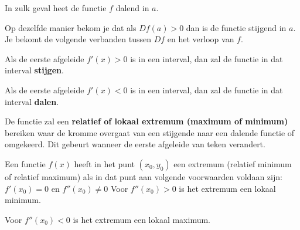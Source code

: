 \begin{center}
	
\end{center}



In zulk geval heet de functie $f$ dalend in $a$.\vspace{5mm}

Op dezelfde manier bekom je dat als $Df(a)>0$ dan is de functie stijgend in $a$.
Je bekomt de volgende verbanden tussen $Df$ en het verloop van $f$.

\begin{eigenschap}
Als de eerste afgeleide $f'(x)>0$  is in een interval, dan zal de functie in dat interval \textbf{stijgen}.

Als de eerste afgeleide $f'(x)<0$ is in een interval, dan zal de functie in dat interval \textbf{dalen}.

De functie zal een \textbf{relatief of lokaal extremum (maximum of minimum)} bereiken waar de kromme overgaat van een stijgende naar een dalende functie of omgekeerd. Dit gebeurt wanneer de eerste afgeleide van teken verandert.

Een functie $f(x)$  heeft in het punt $(x_0,y_0)$ een extremum (relatief minimum of relatief maximum) als in dat punt aan volgende voorwaarden voldaan zijn:
$f'(x_0)=0$
en $f''(x_0)\ne 0$
Voor $f''(x_0)> 0$ is het extremum een lokaal minimum.

Voor $f''(x_0)< 0$ is het extremum een lokaal maximum.
\end{eigenschap}

